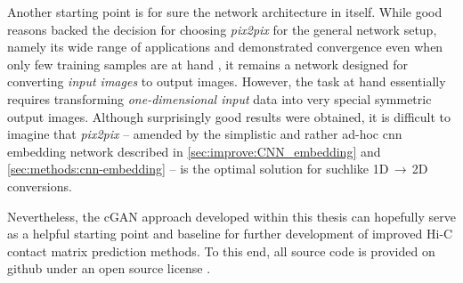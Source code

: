 Another starting point is for sure the network architecture in itself.
While good reasons backed the decision for choosing \emph{pix2pix} for the general network setup,
namely its wide range of applications and demonstrated convergence even when only few training samples are at hand \cite{Isola2017},
it remains a network designed for converting \emph{input images} to output images.
However, the task at hand essentially requires transforming \emph{one-dimensional input} data into very special symmetric output images.
Although surprisingly good results were obtained, it is difficult to imagine that \emph{pix2pix} -- amended by the simplistic and rather ad-hoc \acrshort{cnn} embedding network 
described in \cref{sec:improve:CNN_embedding} and \ref{sec:methods:cnn-embedding} -- is the optimal solution for suchlike 1D\,$\rightarrow$\,2D conversions.

Nevertheless, the cGAN approach developed within this thesis can hopefully serve as a helpful starting point and baseline
for further development of improved Hi-C contact matrix prediction methods.
To this end, all source code is provided on github under an open source license \cite{Krauth2021a, Krauth2021b}.
\clearpage
